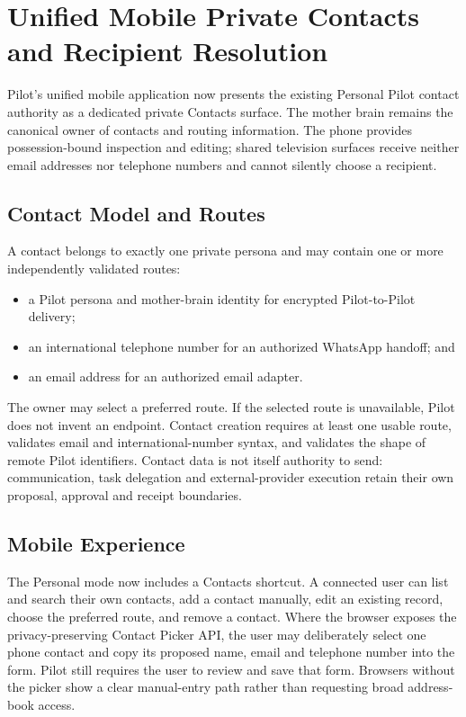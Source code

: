 \section{Unified Mobile Private Contacts and Recipient Resolution}
\label{sec:pilot-unified-mobile-contacts}

Pilot's unified mobile application now presents the existing Personal Pilot contact authority as
a dedicated private Contacts surface.  The mother brain remains the canonical owner of contacts
and routing information.  The phone provides possession-bound inspection and editing; shared
television surfaces receive neither email addresses nor telephone numbers and cannot silently
choose a recipient.

\subsection{Contact Model and Routes}

A contact belongs to exactly one private persona and may contain one or more independently
validated routes:
\begin{itemize}
  \item a Pilot persona and mother-brain identity for encrypted Pilot-to-Pilot delivery;
  \item an international telephone number for an authorized WhatsApp handoff; and
  \item an email address for an authorized email adapter.
\end{itemize}

The owner may select a preferred route.  If the selected route is unavailable, Pilot does not
invent an endpoint.  Contact creation requires at least one usable route, validates email and
international-number syntax, and validates the shape of remote Pilot identifiers.  Contact data
is not itself authority to send: communication, task delegation and external-provider execution
retain their own proposal, approval and receipt boundaries.

\subsection{Mobile Experience}

The Personal mode now includes a Contacts shortcut.  A connected user can list and search their
own contacts, add a contact manually, edit an existing record, choose the preferred route, and
remove a contact.  Where the browser exposes the privacy-preserving Contact Picker API, the user
may deliberately select one phone contact and copy its proposed name, email and telephone number
into the form.  Pilot still requires the user to review and save that form.  Browsers without the
picker show a clear manual-entry path rather than requesting broad address-book access.


